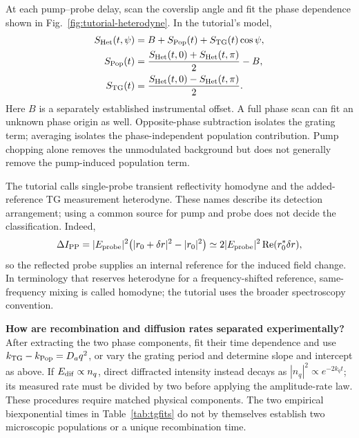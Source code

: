At each pump--probe delay, scan the coverslip angle and fit the phase dependence shown in Fig.~\ref{fig:tutorial-heterodyne}. In the tutorial's model,
\begin{align}
S_{\rm Het}(t,\psi)&=B+S_{\rm Pop}(t)+S_{\rm TG}(t)\cos\psi,\\
S_{\rm Pop}(t)&=\frac{S_{\rm Het}(t,0)+S_{\rm Het}(t,\pi)}{2}-B,\\
S_{\rm TG}(t)&=\frac{S_{\rm Het}(t,0)-S_{\rm Het}(t,\pi)}{2}.
\end{align}
Here $B$ is a separately established instrumental offset. A full phase scan can fit an unknown phase origin as well. Opposite-phase subtraction isolates the grating term; averaging isolates the phase-independent population contribution. Pump chopping alone removes the unmodulated background but does not generally remove the pump-induced population term.

The tutorial calls single-probe transient reflectivity homodyne and the added-reference TG measurement heterodyne. These names describe its detection arrangement; using a common source for pump and probe does not decide the classification. Indeed,
\begin{equation}
\Delta I_{\rm PP}
=|E_{\rm probe}|^2\bigl(|r_0+\delta r|^2-|r_0|^2\bigr)
\simeq2|E_{\rm probe}|^2\operatorname{Re}(r_0^*\delta r),
\end{equation}
so the reflected probe supplies an internal reference for the induced field change. In terminology that reserves heterodyne for a frequency-shifted reference, same-frequency mixing is called homodyne; the tutorial uses the broader spectroscopy convention.

\textbf{How are recombination and diffusion rates separated experimentally?}
After extracting the two phase components, fit their time dependence and use $k_{\rm TG}-k_{\rm Pop}=D_aq^2$, or vary the grating period and determine slope and intercept as above. If $E_{\rm dif}\propto n_q$, direct diffracted intensity instead decays as $|n_q|^2\propto e^{-2k_qt}$; its measured rate must be divided by two before applying the amplitude-rate law. These procedures require matched physical components. The two empirical biexponential times in Table~\ref{tab:tgfits} do not by themselves establish two microscopic populations or a unique recombination time.

